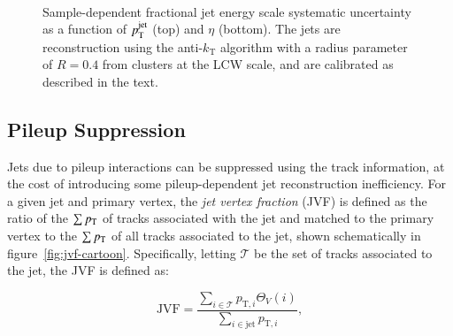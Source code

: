 \begin{figure}[htbp]
{	}
	\hfill
	 \\
	\caption{Sample-dependent fractional jet energy scale systematic uncertainty as a function of $p_{\text{T}}^{\mathrm{jet}}$ (top) and $\eta$ (bottom). The jets are reconstruction using the anti-$k_{\mathrm{T}}$ algorithm with a radius parameter of $R=0.4$ from clusters at the LCW scale, and are calibrated as described in the text.}
	\label{fig:reco-jes-uncertainty}
\end{figure}

\subsection{Pileup Suppression}
Jets due to pileup interactions can be suppressed using the track information, at the cost of introducing some pileup-dependent jet reconstruction inefficiency. For a given jet and primary vertex, the \emph{jet vertex fraction} (JVF) is defined as the ratio of the $\sum p_{\text{T}}$ of tracks associated with the jet and matched to the primary vertex to the $\sum p_{\text{T}}$ of all tracks associated to the jet, shown schematically in figure~\ref{fig:jvf-cartoon}. Specifically, letting $\mathcal{T}$ be the set of tracks associated to the jet, the JVF is defined as:

\begin{equation}\label{eqn:jvf}
	\mathrm{JVF}=\frac{\sum_{i\in\mathcal{T}} p_{\mathrm{T},i} \Theta_V(i)} {\sum_{i\in\mathrm{jet}} p_{\mathrm{T},i} },
\end{equation}

